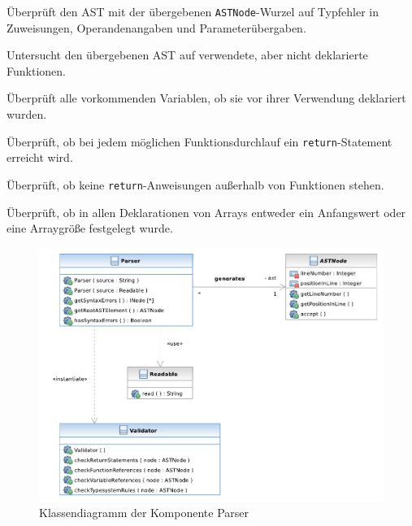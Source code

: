 \begin{description}
    Überprüft den AST mit der übergebenen \texttt{ASTNode}-Wurzel auf Typfehler in Zuweisungen, Operandenangaben und Parameterübergaben.

    Untersucht den übergebenen AST auf verwendete, aber nicht deklarierte Funktionen.

    Überprüft alle vorkommenden Variablen, ob sie vor ihrer Verwendung deklariert wurden.

    Überprüft, ob bei jedem möglichen Funktionsdurchlauf ein \texttt{return}-Statement erreicht wird.
    
    Überprüft, ob keine \texttt{return}-Anweisungen außerhalb von Funktionen stehen.
    
    Überprüft, ob in allen Deklarationen von Arrays entweder ein Anfangswert oder eine Arraygröße festgelegt wurde.
\end{description}

\begin{figure}%

    \caption{Klassendiagramm der Komponente Parser}

    \includegraphics[width=\textwidth]{diagrams/parser_component.pdf}
\end{figure}%

